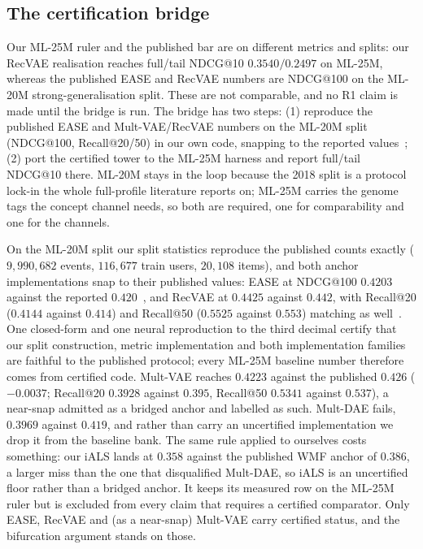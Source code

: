 \documentclass[manuscript,screen]{acmart}
\begin{document}
\subsection{The certification bridge}\label{sec:bridge}
Our ML-25M ruler and the published bar are on different metrics and splits: our RecVAE realisation reaches full/tail NDCG@10 $0.3540/0.2497$ on ML-25M, whereas the published EASE and RecVAE numbers are NDCG@100 on the ML-20M strong-generalisation split. These are not comparable, and no R1 claim is made until the bridge is run. The bridge has two steps: (1) reproduce the published EASE and Mult-VAE/RecVAE numbers on the ML-20M split (NDCG@100, Recall@20/50) in our own code, snapping to the reported values~\citep{steck2019ease,liang2018variational,ren2020recvae}; (2) port the certified tower to the ML-25M harness and report full/tail NDCG@10 there. ML-20M stays in the loop because the 2018 split is a protocol lock-in the whole full-profile literature reports on; ML-25M carries the genome tags the concept channel needs, so both are required, one for comparability and one for the channels.

On the ML-20M split our split statistics reproduce the published counts exactly ($9{,}990{,}682$ events, $116{,}677$ train users, $20{,}108$ items), and both anchor implementations snap to their published values: EASE at NDCG@100 $0.4203$ against the reported $0.420$~\citep{steck2019ease}, and RecVAE at $0.4425$ against $0.442$, with Recall@20 ($0.4144$ against $0.414$) and Recall@50 ($0.5525$ against $0.553$) matching as well~\citep{ren2020recvae}. One closed-form and one neural reproduction to the third decimal certify that our split construction, metric implementation and both implementation families are faithful to the published protocol; every ML-25M baseline number therefore comes from certified code. Mult-VAE reaches $0.4223$ against the published $0.426$ ($-0.0037$; Recall@20 $0.3928$ against $0.395$, Recall@50 $0.5341$ against $0.537$), a near-snap admitted as a bridged anchor and labelled as such. Mult-DAE fails, $0.3969$ against $0.419$, and rather than carry an uncertified implementation we drop it from the baseline bank. The same rule applied to ourselves costs something: our iALS lands at $0.358$ against the published WMF anchor of $0.386$, a larger miss than the one that disqualified Mult-DAE, so iALS is an uncertified floor rather than a bridged anchor. It keeps its measured row on the ML-25M ruler but is excluded from every claim that requires a certified comparator. Only EASE, RecVAE and (as a near-snap) Mult-VAE carry certified status, and the bifurcation argument stands on those.
\end{document}
